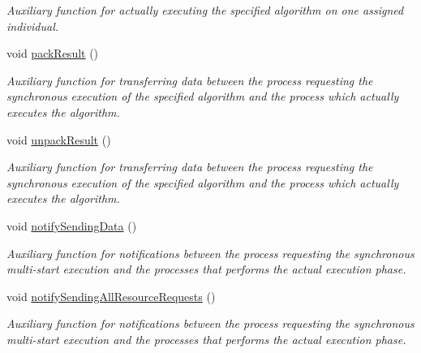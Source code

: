 \begin{CompactItemize}
\begin{CompactList}\small\item\em Auxiliary function for actually executing the specified algorithm on one assigned individual. \item\end{CompactList}\item 
void \hyperlink{classpeoSyncMultiStart_6c48eb0dae741cff7203b65e226f9616}{pack\-Result} ()
\begin{CompactList}\small\item\em Auxiliary function for transferring data between the process requesting the synchronous execution of the specified algorithm and the process which actually executes the algorithm. \item\end{CompactList}\item 
void \hyperlink{classpeoSyncMultiStart_c3cbd1f10a89d1915c5ccf82a2c34a1d}{unpack\-Result} ()
\begin{CompactList}\small\item\em Auxiliary function for transferring data between the process requesting the synchronous execution of the specified algorithm and the process which actually executes the algorithm. \item\end{CompactList}\item 
void \hyperlink{classpeoSyncMultiStart_32ec0d01d3fd8a9932abd68f4781fc94}{notify\-Sending\-Data} ()
\begin{CompactList}\small\item\em Auxiliary function for notifications between the process requesting the synchronous multi-start execution and the processes that performs the actual execution phase. \item\end{CompactList}\item 
void \hyperlink{classpeoSyncMultiStart_fc90282cc4e93cdea8f82fd52dd78fb0}{notify\-Sending\-All\-Resource\-Requests} ()
\begin{CompactList}\small\item\em Auxiliary function for notifications between the process requesting the synchronous multi-start execution and the processes that performs the actual execution phase. \item\end{CompactList}\end{CompactItemize}
